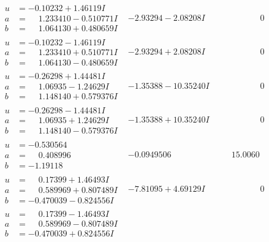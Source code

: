 \documentclass[1p]{elsarticle_modified}
\theoremstyle{definition}
\begin{document}
$$\begin{array}{c|c|c}
\begin{aligned}
u &= -0.10232 + 1.46119 I \\
a &= \phantom{-}1.233410 - 0.510771 I \\
b &= \phantom{-}1.064130 + 0.480659 I\end{aligned}
 & -2.93294 - 2.08208 I & \phantom{-0.000000 } 0 \\ \hline\begin{aligned}
u &= -0.10232 - 1.46119 I \\
a &= \phantom{-}1.233410 + 0.510771 I \\
b &= \phantom{-}1.064130 - 0.480659 I\end{aligned}
 & -2.93294 + 2.08208 I & \phantom{-0.000000 } 0 \\ \hline\begin{aligned}
u &= -0.26298 + 1.44481 I \\
a &= \phantom{-}1.06935 - 1.24629 I \\
b &= \phantom{-}1.148140 + 0.579376 I\end{aligned}
 & -1.35388 - 10.35240 I & \phantom{-0.000000 } 0 \\ \hline\begin{aligned}
u &= -0.26298 - 1.44481 I \\
a &= \phantom{-}1.06935 + 1.24629 I \\
b &= \phantom{-}1.148140 - 0.579376 I\end{aligned}
 & -1.35388 + 10.35240 I & \phantom{-0.000000 } 0 \\ \hline\begin{aligned}
u &= -0.530564\phantom{ +0.000000I} \\
a &= \phantom{-}0.408996\phantom{ +0.000000I} \\
b &= -1.19118\phantom{ +0.000000I}\end{aligned}
 & -0.0949506\phantom{ +0.000000I} & \phantom{-}15.0060\phantom{ +0.000000I} \\ \hline\begin{aligned}
u &= \phantom{-}0.17399 + 1.46493 I \\
a &= \phantom{-}0.589969 + 0.807489 I \\
b &= -0.470039 - 0.824556 I\end{aligned}
 & -7.81095 + 4.69129 I & \phantom{-0.000000 } 0 \\ \hline\begin{aligned}
u &= \phantom{-}0.17399 - 1.46493 I \\
a &= \phantom{-}0.589969 - 0.807489 I \\
b &= -0.470039 + 0.824556 I\end{aligned}

\end{array}$$
\end{document}
